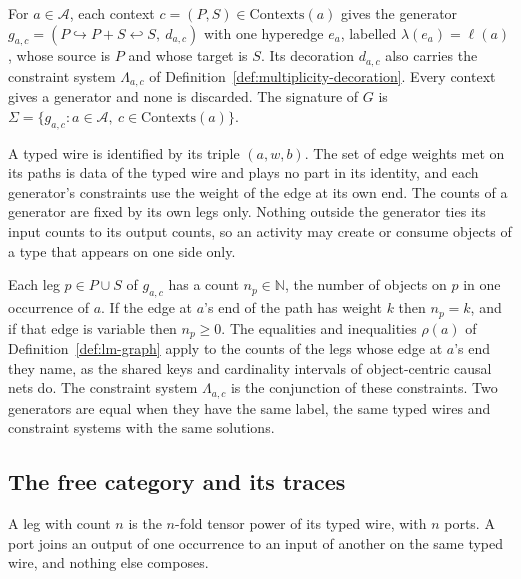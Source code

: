 \begin{definition}
  \label{def:generator-cospan-general}
  For $a\in\mathcal{A}$, each context $c=(P,S)\in\mathrm{Contexts}(a)$ gives the generator
  $g_{a,c}=(P\hookrightarrow P+S\hookleftarrow S,\ d_{a,c})$ with one hyperedge $e_a$, labelled
  $\lambda(e_a)=\ell(a)$, whose source is $P$ and whose target is $S$. Its decoration $d_{a,c}$
  also carries the constraint system $\Lambda_{a,c}$ of
  Definition~\ref{def:multiplicity-decoration}. Every context gives a generator and none is
  discarded. The signature of $G$ is
  $\Sigma=\{g_{a,c} : a\in\mathcal{A},\ c\in\mathrm{Contexts}(a)\}$.
\end{definition}

A typed wire is identified by its triple $(a,w,b)$. The set of edge weights met on its paths is
data of the typed wire and plays no part in its identity, and each generator's constraints use the weight of
the edge at its own end. The counts of a generator are fixed by its own legs only. Nothing
outside the generator ties its input counts to its output counts, so an activity may create or
consume objects of a type that appears on one side only.

\begin{definition}
  \label{def:multiplicity-decoration}
  Each leg $p\in P\cup S$ of $g_{a,c}$ has a count $n_p\in\mathbb{N}$, the number of objects
  on $p$ in one occurrence of $a$. If the edge at $a$'s end of the path has weight $k$ then
  $n_p=k$, and if that edge is variable then $n_p\ge 0$. The equalities and inequalities
  $\rho(a)$ of Definition~\ref{def:lm-graph} apply to the counts of the legs whose edge at $a$'s
  end they name, as the shared keys and cardinality intervals of object-centric causal nets do. The constraint system $\Lambda_{a,c}$ is the conjunction of these
  constraints. Two generators are equal when they have the same label, the same typed wires and
  constraint systems with the same solutions.
\end{definition}

\subsection{The free category and its traces}
\label{subsec:free-category}

A leg with count $n$ is the $n$-fold tensor power of its typed wire, with $n$ ports. A port joins
an output of one occurrence to an input of another on the same typed wire, and nothing else
composes.

